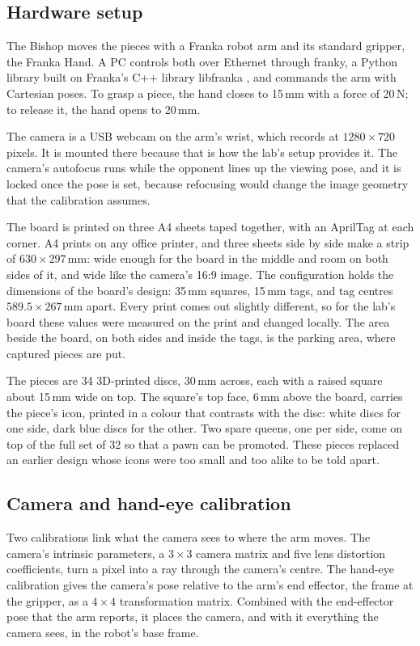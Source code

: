 \subsection{Hardware setup}
\label{subsec:hardware}

The Bishop moves the pieces with a Franka robot arm and its standard gripper, the Franka Hand.
A PC controls both over Ethernet through franky, a Python library built on Franka's C++ library libfranka \cite{franky}, and commands the arm with Cartesian poses.
To grasp a piece, the hand closes to 15\,mm with a force of 20\,N; to release it, the hand opens to 20\,mm.

The camera is a USB webcam on the arm's wrist, which records at $1280 \times 720$ pixels.
It is mounted there because that is how the lab's setup provides it.
The camera's autofocus runs while the opponent lines up the viewing pose, and it is locked once the pose is set, because refocusing would change the image geometry that the calibration assumes.

The board is printed on three A4 sheets taped together, with an AprilTag at each corner.
A4 prints on any office printer, and three sheets side by side make a strip of $630 \times 297$\,mm: wide enough for the board in the middle and room on both sides of it, and wide like the camera's 16:9 image.
The configuration holds the dimensions of the board's design: 35\,mm squares, 15\,mm tags, and tag centres $589.5 \times 267$\,mm apart.
Every print comes out slightly different, so for the lab's board these values were measured on the print and changed locally.
The area beside the board, on both sides and inside the tags, is the parking area, where captured pieces are put.

The pieces are 34 3D-printed discs, 30\,mm across, each with a raised square about 15\,mm wide on top.
The square's top face, 6\,mm above the board, carries the piece's icon, printed in a colour that contrasts with the disc: white discs for one side, dark blue discs for the other.
Two spare queens, one per side, come on top of the full set of 32 so that a pawn can be promoted.
These pieces replaced an earlier design whose icons were too small and too alike to be told apart.

\subsection{Camera and hand-eye calibration}
\label{subsec:calibration}

Two calibrations link what the camera sees to where the arm moves.
The camera's intrinsic parameters, a $3 \times 3$ camera matrix and five lens distortion coefficients, turn a pixel into a ray through the camera's centre.
The hand-eye calibration gives the camera's pose relative to the arm's end effector, the frame at the gripper, as a $4 \times 4$ transformation matrix.
Combined with the end-effector pose that the arm reports, it places the camera, and with it everything the camera sees, in the robot's base frame.

